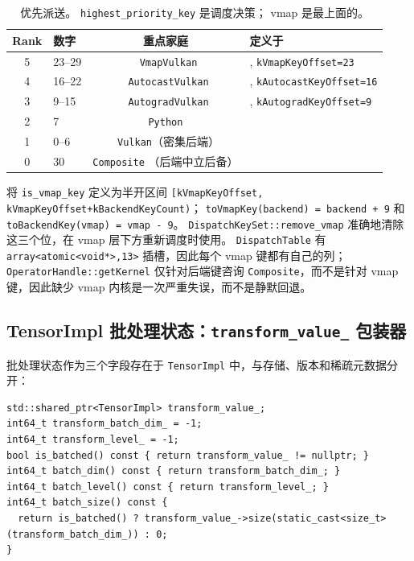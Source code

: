 \begin{table}[H]
\centering
\caption{优先派送。 \texttt{highest\_priority\_key} 是调度决策； vmap 是最上面的。}
\label{tab:vmappriority}
\small
\begin{tabular}{clcl}
\toprule
Rank & 数字 & 重点家庭 & 定义于 \\
\midrule
5 & 23--29 & \texttt{ VmapVulkan} & , \texttt{kVmapKeyOffset=23} \\
4 & 16--22 & \texttt{ AutocastVulkan} & , \texttt{kAutocastKeyOffset=16} \\
3 & 9--15 & \texttt{ AutogradVulkan} & , \texttt{kAutogradKeyOffset=9} \\
2 & 7 & \texttt{Python} & \\
1 & 0--6 & \texttt{ Vulkan}（密集后端） & \\
0 & 30 & \texttt{Composite} （后端中立后备） & \\
\bottomrule
\end{tabular}
\end{table}

将 \texttt{is\_vmap\_key} 定义为半开区间 \texttt{[kVmapKeyOffset, kVmapKeyOffset+kBackendKeyCount)}； \texttt{toVmapKey(backend) = backend + 9} 和 \texttt{toBackendKey(vmap) = vmap - 9}。 \texttt{DispatchKeySet::remove\_vmap} 准确地清除这三个位，在 vmap 层下方重新调度时使用。 \texttt{DispatchTable} 有 \texttt{array<atomic<void*>,13>} 插槽，因此每个 vmap 键都有自己的列； \texttt{OperatorHandle::getKernel} 仅针对后端键咨询 \texttt{Composite}，而不是针对 vmap 键，因此缺少 vmap 内核是一次严重失误，而不是静默回退。

\subsection{TensorImpl 批处理状态：\texttt{transform\_value\_} 包装器}
\label{sec:batchstate}

批处理状态作为三个字段存在于 \texttt{TensorImpl} 中，与存储、版本和稀疏元数据分开：

\begin{lstlisting}[caption={batching fields.}, label=lst:batchfields]
std::shared_ptr<TensorImpl> transform_value_;
int64_t transform_batch_dim_ = -1;
int64_t transform_level_ = -1;
bool is_batched() const { return transform_value_ != nullptr; }
int64_t batch_dim() const { return transform_batch_dim_; }
int64_t batch_level() const { return transform_level_; }
int64_t batch_size() const {
  return is_batched() ? transform_value_->size(static_cast<size_t>(transform_batch_dim_)) : 0;
}
\end{lstlisting}

